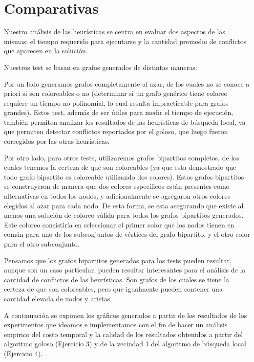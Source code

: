 \section{Comparativas}
Nuestro análisis de las heurísticas se centra en evaluar dos aspectos de las mismas: el tiempo requerido para ejecutarse y la cantidad promedio de conflictos que aparecen en la solución.


Nuestros test se basan en grafos generados de distintas maneras:

Por un lado generamos grafos completamente al azar, de los cuales no se conoce a priori si son coloreables o no (determinar si un grafo genérico tiene coloreo requiere un tiempo no polinomial, lo cual resulta impracticable para grafos grandes). Estos test, además de ser útiles para medir el tiempo de ejecución, también permiten analizar los resultados de las heurísticas de búsqueda local, ya que permiten detectar conflictos reportados por el goloso, que luego fueron corregidos por las otras heurísticas.

Por otro lado, para otros tests, utilizaremos grafos bipartitos completos, de los cuales tenemos la certeza de que son coloreables (ya que esta demostrado que todo grafo bipartito es coloreable utilizando dos colores). Estos grafos bipartitos se construyeron de manera que dos colores específicos están presentes como alternativas en todos los nodos,  y adicionalmente se agregaron otros colores elegidos al azar para cada nodo. De esta forma, se esta asegurando que existe al menos una solución de coloreo válida para todos los grafos bipartitos generados. Este coloreo consistiría en seleccionar el primer color que los nodos tienen en común para uno de los subconjuntos de vértices del grafo bipartito, y el otro color para el otro subconjunto.

Pensamos que los grafos bipartitos generados para los tests pueden resultar, aunque son un caso particular, pueden resultar interesantes para el análisis de la cantidad de conflictos de las heurísticas. Son grafos de los cuales se tiene la certeza de que son coloreables, pero que igualmente pueden contener una cantidad elevada de nodos y aristas.

A continuación se exponen los gráficos generados a partir de los resultados de los experimentos que ideamos e implementamos con el fin de hacer un análisis empirico del costo temporal y la calidad de los resultados obtenidos a partir del algoritmo goloso (Ejercicio 3) y de la vecindad 1 del algoritmo de búsqueda local (Ejercicio 4).

